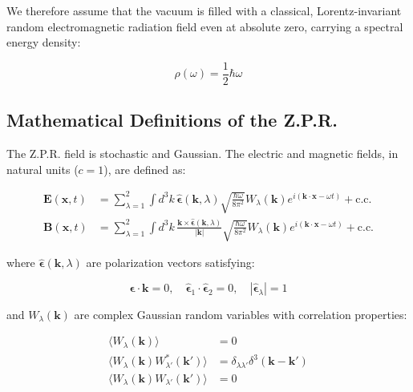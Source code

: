 \documentclass {article}
\renewcommand\vec{\mathbf}
\let\OldHat\hat
\renewcommand{\hat}[1]{\OldHat{\mathbf{#1}}}
\begin{document}
We therefore assume that the vacuum is filled with a classical, Lorentz-invariant random electromagnetic radiation field even at absolute zero, carrying a spectral energy density:

\begin{equation}
\rho(\omega) = \frac{1}{2} \hbar \omega
\end{equation}


\subsection{Mathematical Definitions of the Z.P.R.}


The Z.P.R. field is stochastic and Gaussian. The electric and magnetic fields, in natural units (\(c=1\)), are defined as:

\begin{equation}
\begin{aligned}
\vec{E}(\vec{x}, t) &= \sum_{\lambda=1}^2 \int d^3k \, 
\hat{\epsilon}(\vec{k}, \lambda) 
\sqrt{\frac{\hbar \omega}{8\pi^2}} 
W_\lambda(\vec{k}) e^{i(\vec{k} \cdot \vec{x} - \omega t)} + \text{c.c.}\\
\vec{B}(\vec{x}, t) &= \sum_{\lambda=1}^2 \int d^3k \, 
\frac{\vec{k} \times \hat{\epsilon}(\vec{k}, \lambda)}{|\vec{k}|}
\sqrt{\frac{\hbar \omega}{8\pi^2}} 
W_\lambda(\vec{k}) e^{i(\vec{k} \cdot \vec{x} - \omega t)} + \text{c.c.}
\end{aligned}
\end{equation}

\noindent where $\hat{\epsilon}(\vec{k}, \lambda)$ are polarization vectors satisfying: 

\begin{equation}
\hat{\epsilon} \cdot \vec{k} = 0, \quad
\hat{\epsilon}_1\cdot\hat{\epsilon}_2 = 0, \quad
|\hat{\epsilon}_\lambda| = 1
\end{equation}

\noindent and $W_\lambda(\vec{k})$ are complex Gaussian random variables with correlation properties:

\begin{equation}
\begin{aligned}
\langle W_\lambda(\vec{k}) \rangle &= 0\\
\langle W_\lambda(\vec{k}) W_{\lambda'}^*(\vec{k}') \rangle &= \delta_{\lambda\lambda'} \delta^3(\vec{k} - \vec{k}')\\
\langle W_\lambda(\vec{k}) W_{\lambda'}(\vec{k}') \rangle &= 0
\end{aligned}
\label{eq:stochastic}
\end{equation}
\end{document}
